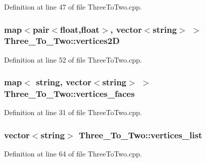 Definition at line 47 of file Three\+To\+Two.\+cpp.

\subsubsection[{\texorpdfstring{vertices2D}{vertices2D}}]{\setlength{\rightskip}{0pt plus 5cm}map$<$pair$<$float,float$>$, vector$<$string$>$ $>$ Three\+\_\+\+To\+\_\+\+Two\+::vertices2D}\hypertarget{class_three___to___two_a1116965a6138a9b16fee724eccff6ba5}{}\label{class_three___to___two_a1116965a6138a9b16fee724eccff6ba5}


Definition at line 52 of file Three\+To\+Two.\+cpp.

\subsubsection[{\texorpdfstring{vertices\+\_\+faces}{vertices_faces}}]{\setlength{\rightskip}{0pt plus 5cm}map$<$ string, vector$<$string$>$ $>$ Three\+\_\+\+To\+\_\+\+Two\+::vertices\+\_\+faces}\hypertarget{class_three___to___two_ab76600933c530c9a6e7a54cf39df7bc9}{}\label{class_three___to___two_ab76600933c530c9a6e7a54cf39df7bc9}


Definition at line 31 of file Three\+To\+Two.\+cpp.

\subsubsection[{\texorpdfstring{vertices\+\_\+list}{vertices_list}}]{\setlength{\rightskip}{0pt plus 5cm}vector$<$string$>$ Three\+\_\+\+To\+\_\+\+Two\+::vertices\+\_\+list}\hypertarget{class_three___to___two_a08809b4ff50badda240d9adb8847405c}{}\label{class_three___to___two_a08809b4ff50badda240d9adb8847405c}


Definition at line 64 of file Three\+To\+Two.\+cpp.

